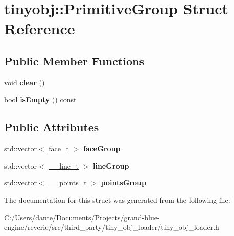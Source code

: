 \hypertarget{structtinyobj_1_1_primitive_group}{}\section{tinyobj\+::Primitive\+Group Struct Reference}
\label{structtinyobj_1_1_primitive_group}
\subsection*{Public Member Functions}
\begin{DoxyCompactItemize}
\item 
\mbox{\label{structtinyobj_1_1_primitive_group_a509d189a47bf42bb2b5339ef847ab9f8}} 
void {\bfseries clear} ()
\item 
\mbox{\label{structtinyobj_1_1_primitive_group_a1216082b490de6df76f1062156b36f0e}} 
bool {\bfseries is\+Empty} () const
\end{DoxyCompactItemize}
\subsection*{Public Attributes}
\begin{DoxyCompactItemize}
\item 
\mbox{\label{structtinyobj_1_1_primitive_group_a366c577f916d66f5c3d00fa7a718d82e}} 
std\+::vector$<$ \mbox{\hyperlink{structtinyobj_1_1face__t}{face\+\_\+t}} $>$ {\bfseries face\+Group}
\item 
\mbox{\label{structtinyobj_1_1_primitive_group_a6baeb6e2e157a0822d70233221f9b8d3}} 
std\+::vector$<$ \mbox{\hyperlink{structtinyobj_1_1____line__t}{\+\_\+\+\_\+line\+\_\+t}} $>$ {\bfseries line\+Group}
\item 
\mbox{\label{structtinyobj_1_1_primitive_group_a358fe6b05ab63b5ab02d28ad1597dfec}} 
std\+::vector$<$ \mbox{\hyperlink{structtinyobj_1_1____points__t}{\+\_\+\+\_\+points\+\_\+t}} $>$ {\bfseries points\+Group}
\end{DoxyCompactItemize}


The documentation for this struct was generated from the following file\+:\begin{DoxyCompactItemize}
\item 
C\+:/\+Users/dante/\+Documents/\+Projects/grand-\/blue-\/engine/reverie/src/third\+\_\+party/tiny\+\_\+obj\+\_\+loader/tiny\+\_\+obj\+\_\+loader.\+h\end{DoxyCompactItemize}

